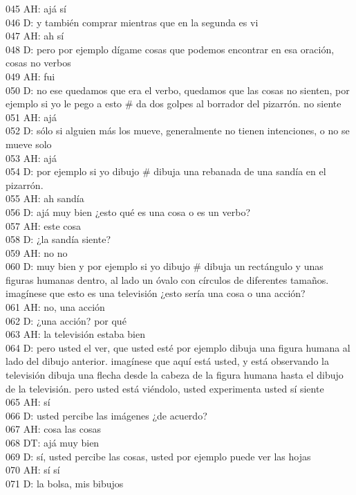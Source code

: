 045 AH: ajá sí\\
046 D: y también comprar mientras que en la segunda es vi\\
047 AH: ah sí\\
048 D: pero por ejemplo dígame cosas que podemos encontrar en esa oración, cosas no verbos\\
049 AH: fui\\
050 D: no ese quedamos que era el verbo, quedamos que las cosas no sienten, por ejemplo si yo le pego a esto \# da dos golpes al borrador del pizarrón. no siente\\
051 AH: ajá\\
052 D: sólo si alguien más los mueve, generalmente no tienen intenciones, o no se mueve solo\\
053 AH: ajá\\
054 D: por ejemplo si yo dibujo \# dibuja una rebanada de una sandía en el pizarrón.\\
055 AH: ah sandía\\
056 D: ajá muy bien ¿esto qué es una cosa o es un verbo?\\
057 AH: este cosa\\
058 D: ¿la sandía siente?\\
059 AH: no no\\
060 D: muy bien y por ejemplo si yo dibujo \# dibuja un rectángulo y unas figuras humanas dentro, al lado un óvalo con círculos de diferentes tamaños. imagínese que esto es una televisión ¿esto sería una cosa o una acción?\\
061 AH: no, una acción\\
062 D: ¿una acción? por qué\\
063 AH: la televisión estaba bien\\
064 D: pero usted el ver, que usted esté por ejemplo  dibuja una figura humana al lado del dibujo anterior. imagínese que aquí está usted, y está observando la televisión  dibuja una flecha desde la cabeza de la figura humana hasta el dibujo de la televisión. pero usted está viéndolo, usted experimenta usted sí siente\\
065 AH: sí\\
066 D: usted percibe las imágenes ¿de acuerdo?\\
067 AH: cosa las cosas\\
068 DT: ajá muy bien\\
069 D: sí, usted percibe las cosas, usted por ejemplo puede ver las hojas\\
070 AH: sí sí\\
071 D: la bolsa, mis bibujos\\
